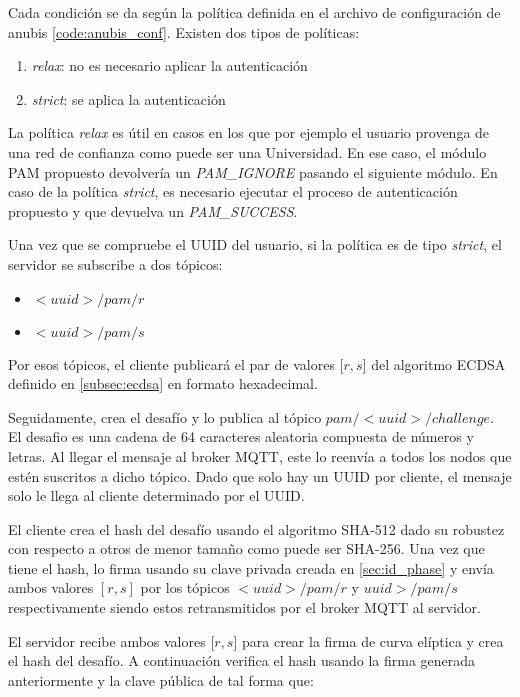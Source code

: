 Cada condición se da según la política definida en el archivo de configuración de anubis \ref{code:anubis_conf}. Existen dos 
tipos de políticas:

\begin{enumerate}
    \item \textit{relax}: no es necesario aplicar la autenticación
    \item \textit{strict}: se aplica la autenticación
\end{enumerate}

La política \textit{relax} es útil en casos en los que por ejemplo el usuario provenga de una red de confianza como puede ser una
Universidad. En ese caso, el módulo PAM propuesto devolvería un \textit{PAM\_IGNORE} pasando el siguiente módulo. En caso de la 
política \textit{strict}, es necesario ejecutar el proceso de autenticación propuesto y que devuelva un \textit{PAM\_SUCCESS}.

Una vez que se compruebe el UUID del usuario, si la política es de tipo \textit{strict}, el servidor se subscribe a dos tópicos:

\begin{itemize}
    \item $<uuid>/pam/r$
    \item $<uuid>/pam/s$
\end{itemize}

Por esos tópicos, el cliente publicará el par de valores [$r, s$] del algoritmo ECDSA definido en \ref{subsec:ecdsa} en formato 
hexadecimal.

Seguidamente, crea el desafío y lo publica al tópico $pam/<uuid>/challenge$. El desafio es una cadena de 64 caracteres aleatoria
compuesta de números y letras. Al llegar el mensaje al broker MQTT, este lo reenvía a todos los nodos que estén suscritos a dicho 
tópico. Dado que solo hay un UUID por cliente, el mensaje solo le llega al cliente determinado por el UUID. 

El cliente crea el hash del desafío usando el algoritmo SHA-512 dado su robustez con respecto a otros de menor tamaño como puede 
ser SHA-256. Una vez que tiene el hash, lo firma usando su clave privada creada en \ref{sec:id_phase} y envía ambos valores $[r,s]$ 
por los tópicos $<uuid>/pam/r$ y $uuid>/pam/s$ respectivamente siendo estos retransmitidos por el broker MQTT al servidor.

El servidor recibe ambos valores [$r, s$] para crear la firma de curva elíptica y crea el hash del desafío. A continuación verifica
el hash usando la firma generada anteriormente y la clave pública de tal forma que:

